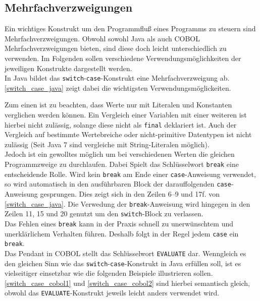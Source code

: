 \subsection{Mehrfachverzweigungen}\label{mehrfachverzweigungen}
Ein wichtiges Konstrukt um den Programmfluß eines Programms zu steuern sind Mehrfachverzweigungen. Obwohl sowohl Java als auch COBOL Mehrfachverzweigungen bieten, sind diese doch leicht unterschiedlich zu verwenden. Im Folgenden sollen verschiedene Verwendungsmöglichkeiten der jeweiligen Konstrukte dargestellt werden.\\

In Java bildet das \texttt{switch}-\texttt{case}-Konstrukt eine Mehrfachverzweigung ab. \autoref{switch_case_java} zeigt dabei die wichtigsten Verwendungsmöglickeiten.


Zum einen ist zu beachten, dass Werte nur mit Literalen und Konstanten verglichen werden können. Ein Vergleich einer Variablen mit einer weiteren ist hierbei nicht zulässig, solange diese nicht als \texttt{final} deklariert ist. Auch der Vergleich auf bestimmte Wertebreiche oder nicht-primitive Datentypen ist nicht zulässig (Seit Java 7 sind vergleiche mit String-Literalen möglich).\\

Jedoch ist ein gewolltes  möglich um bei verschiedenen Werten die gleichen Programmzweige zu durchlaufen. Dabei Spielt das Schlüsselwort \texttt{break} eine entscheidende Rolle. Wird kein \texttt{break} am Ende einer \texttt{case}-Anweisung verwendet, so wird automatisch in den ausführbaren Block der darauffolgenden \texttt{case}-Anweisung gesprungen. Dies zeigt sich in den Zeilen 6--9 und 17f. von \autoref{switch_case_java}. Die Verwedung der \texttt{break}-Anweisung wird hingegen in den Zeilen 11, 15 und 20 genutzt um den \texttt{switch}-Block zu verlassen.\\ 

Das Fehlen eines \texttt{break} kann in der Praxis schnell zu unerwünschtem und unerklärlichem Verhalten führen. Deshalb folgt in der Regel jedem \texttt{case} ein \texttt{break}. \\

Das Pendant in COBOL stellt das Schlüsselwort \texttt{EVALUATE} dar. Wenngleich es den gleichen Sinn wie das \texttt{switch}-\texttt{case}-Konstrukt in Java erfüllen soll, ist es vielseitiger einsetzbar wie die folgenden Beispiele illustrieren sollen. \autoref{switch_case_cobol1} und \autoref{switch_case_cobol2} sind hierbei semantisch gleich, obwohl das \texttt{EVALUATE}-Konstrukt jeweils leicht anders verwendet wird.\\

